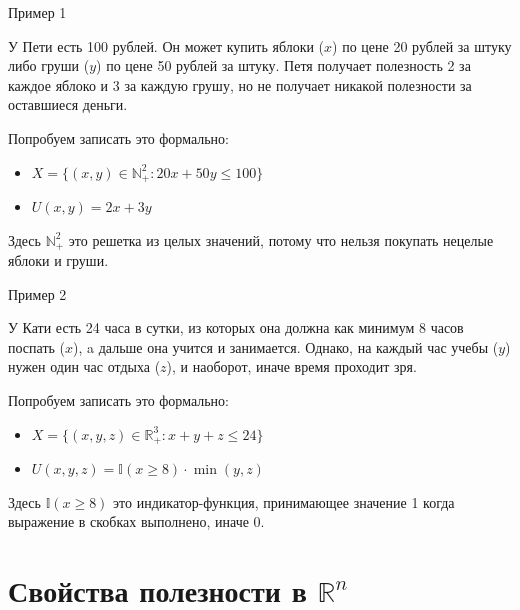 \documentclass{beamer}
\begin{document}
\begin{frame}{Пример 1}

У Пети есть 100 рублей. Он может купить яблоки ($x$) по цене 20 рублей за штуку либо груши ($y$) по цене 50 рублей за штуку. Петя получает полезность 2 за каждое яблоко и 3 за каждую грушу, но не получает никакой полезности за оставшиеся деньги. 

Попробуем записать это формально:

\begin{itemize}
  \item $X = \{(x, y) \in  \mathbb{N}^2_{+}: 20 x + 50 y \leqslant 100 \}$
  \item $U(x, y) = 2x + 3y$
\end{itemize}

Здесь $\mathbb{N}^2_{+}$ это \alert{решетка из целых значений}, потому что нельзя покупать нецелые яблоки и груши.

\end{frame}

\begin{frame}{Пример 2}

У Кати есть 24 часа в сутки, из которых она должна как минимум 8 часов поспать ($x$), a дальше она учится и занимается. Однако, на каждый час учебы ($y$) нужен один час отдыха ($z$), и наоборот, иначе время проходит зря.

Попробуем записать это формально:

\begin{itemize}
  \item $X = \{(x, y, z) \in  \mathbb{R}^3_{+}: x + y + z \leqslant 24 \}$
  \item $U(x, y, z) = \mathbb{I}(x \geqslant 8)\cdot \min(y,z)$
\end{itemize}

Здесь $\mathbb{I}(x \geqslant 8)$ это \alert{индикатор-функция}, принимающее значение 1 когда выражение в скобках выполнено, иначе 0.

\end{frame}

\section{Свойства полезности в $\mathbb{R}^n$}
\end{document}
